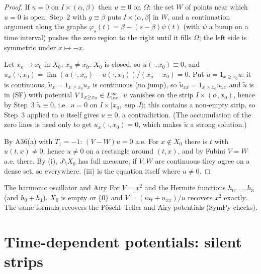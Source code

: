 \begin{proof}
If $u=0$ on $I\times(\alpha,\beta)$ then $u\equiv0$ on $\Omega$: the set $W$ of points near which $u=0$ is open; Step~2 with $g\equiv\beta$ puts $I\times(\alpha,\beta]$ in $W$, and a continuation argument along the graphs $\varphi_s(t)=\beta+(s-\beta)\psi(t)$ (with $\psi$ a bump on a time interval) pushes the zero region to the right until it fills $\Omega$; the left side is symmetric under $x\mapsto-x$.

Let $x_n\to x_0$ in $X_0$, $x_n\ne x_0$. $X_0$ is closed, so $u(\cdot,x_0)\equiv0$, and $u_x(\cdot,x_0)=\lim(u(\cdot,x_n)-u(\cdot,x_0))/(x_n-x_0)=0$. Put $\tilde u=1_{x\ge x_0}u$: it is continuous, $\tilde u_x=1_{x\ge x_0}u_x$ is continuous (no jump), so $\tilde u_{xx}=1_{x\ge x_0}u_{xx}$ and $\tilde u$ is in (SF) with potential $V1_{x\ge x_0}\in L^\infty_{\rm loc}$. $\tilde u$ vanishes on the strip $I\times(\alpha,x_0)$, hence by Step~3 $\tilde u\equiv0$, i.e.\ $u=0$ on $I\times[x_0,\sup J)$; this contains a non-empty strip, so Step~3 applied to $u$ itself gives $u\equiv0$, a contradiction. (The accumulation of the zero lines is used only to get $u_x(\cdot,x_0)=0$, which makes $\tilde u$ a strong solution.)

By A36(a) with $T_1=-1$: $(V-W)u=0$ a.e. For $x\notin X_0$ there is $t$ with $u(t,x)\ne0$, hence $u\ne0$ on a rectangle around $(t,x)$, and by Fubini $V=W$ a.e. there. By (i), $J\setminus X_0$ has full measure; if $V,W$ are continuous they agree on a dense set, so everywhere. (iii) is the equation itself where $u\ne0$.

\end{proof}

\begin{example}{The harmonic oscillator and Airy}
For $V=x^2$ and the Hermite functions $h_0,\dots,h_3$ (and $h_0+h_1$), $X_0$ is empty or $\{0\}$ and $V=(iu_t+u_{xx})/u$ recovers $x^2$ exactly. The same formula recovers the P\"oschl--Teller and Airy potentials (SymPy checks).
\end{example}

\section{Time-dependent potentials: silent strips}

